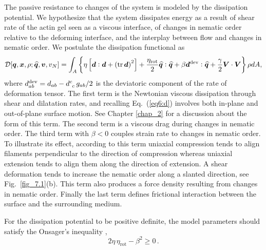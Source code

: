 The passive resistance to changes of the system is modeled by the dissipation potential. We hypothesize that the system dissipates energy as a result of shear rate of the actin gel seen as a viscous interface, of changes in  nematic order  relative to the deforming interface, and the interplay between flow and changes in nematic order. We postulate the dissipation functional as
\begin{align}  \label{58_II}
	\mathcal{D}[\bm{q}, \bm{x},\rho;  \widehat{\bm{q}}, \bm{v},v_N]   =  {\int_A} \left\{  \eta \left[  \bm{d} : \bm{d} + \left(\text{tr} \, \bm{d}\right)^2\right] +   \frac{\eta_{\text{rot}}}{2}  \widehat{\bm{q}}:\widehat{\bm{q}} +  \beta  \bm{d}^{\rm dev}:\widehat{\bm{q}}   +  \frac{\gamma}{2} \bm{V} \cdot \bm{V} \right\}  \rho d A , 
\end{align}
where $d^{\rm dev}_{ab} = d_{ab} - d^{c}_{~ c} \, g_{ab}/2 $ is the deviatoric component of the rate of deformation tensor. The first term is the Newtonian viscous dissipation  through shear and dilatation rates, and recalling Eq.~(\ref{eq6:d}) involves both in-plane and out-of-plane surface motion. See Chapter \ref{chap_2} for a discussion about the form of this term. The second term is a viscous drag during changes in nematic order. The third term with $\beta<0$ couples strain rate to changes in nematic order. To illustrate its effect, according to this term uniaxial compression tends to align filaments perpendicular to the direction of compression whereas uniaxial extension tends to align them along the direction of extension. A shear deformation tends to increase the nematic order along a slanted direction, see Fig.~\ref{fig_7.1}(b). This term also produces a force density resulting from changes in nematic order. 
Finally the last term defines frictional interaction between the surface and the surrounding medium. 

For the dissipation potential to be positive definite, the model parameters should satisfy the Onsager's inequality \cite{Onsager1931}, 
\begin{equation} \label{59_II}
	2\eta \, \eta_{\text{rot}} - \beta^2 \geq 0 \, .
\end{equation}

